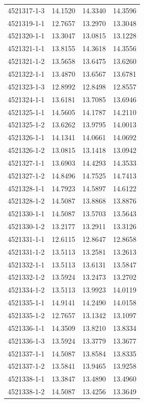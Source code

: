 \begin{longtable}{lrrr}
4521317-1-3 & 14.1520 & 14.3340 & 14.3596 \\
4521319-1-1 & 12.7657 & 13.2970 & 13.3048 \\
4521320-1-1 & 13.3047 & 13.0815 & 13.1228 \\
4521321-1-1 & 13.8155 & 14.3618 & 14.3556 \\
4521321-1-2 & 13.5658 & 13.6475 & 13.6260 \\
4521322-1-1 & 13.4870 & 13.6567 & 13.6781 \\
4521323-1-3 & 12.8992 & 12.8498 & 12.8557 \\
4521324-1-1 & 13.6181 & 13.7085 & 13.6946 \\
4521325-1-1 & 14.5605 & 14.1787 & 14.2110 \\
4521325-1-2 & 13.6262 & 13.9795 & 14.0013 \\
4521326-1-1 & 14.1341 & 14.0661 & 14.0692 \\
4521326-1-2 & 13.0815 & 13.1418 & 13.0942 \\
4521327-1-1 & 13.6903 & 14.4293 & 14.3533 \\
4521327-1-2 & 14.8496 & 14.7525 & 14.7413 \\
4521328-1-1 & 14.7923 & 14.5897 & 14.6122 \\
4521328-1-2 & 14.5087 & 13.8868 & 13.8876 \\
4521330-1-1 & 14.5087 & 13.5703 & 13.5643 \\
4521330-1-2 & 13.2177 & 13.2911 & 13.3126 \\
4521331-1-1 & 12.6115 & 12.8647 & 12.8658 \\
4521331-1-2 & 13.5113 & 13.2581 & 13.2613 \\
4521332-1-1 & 13.5113 & 13.6131 & 13.5847 \\
4521332-1-2 & 13.5924 & 13.2473 & 13.2702 \\
4521334-1-2 & 13.5113 & 13.9923 & 14.0119 \\
4521335-1-1 & 14.9141 & 14.2490 & 14.0158 \\
4521335-1-2 & 12.7657 & 13.1342 & 13.1097 \\
4521336-1-1 & 14.3509 & 13.8210 & 13.8334 \\
4521336-1-3 & 13.5924 & 13.3779 & 13.3677 \\
4521337-1-1 & 14.5087 & 13.8584 & 13.8335 \\
4521337-1-2 & 13.5841 & 13.9465 & 13.9258 \\
4521338-1-1 & 13.3847 & 13.4890 & 13.4960 \\
4521338-1-2 & 14.5087 & 13.4256 & 13.3649 \\

\end{longtable}
